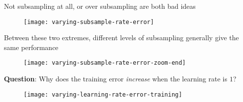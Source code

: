 %
\begin{frame}
Not subsampling at all, or over subsampling are both bad ideas

  \begin{figure}
    \texttt{[image: varying-subsample-rate-error]}
  \end{figure}
 
\end{frame}
%
\begin{frame}
Between these two extremes, different levels of subsampling generally give the same performance

  \begin{figure}
    \texttt{[image: varying-subsample-rate-error-zoom-end]}
  \end{figure}
  
\end{frame}
%


\begin{frame}
\textbf{Question}: Why does the training error \textit{increase} when the learning rate is $1$?

  \begin{figure}
    \texttt{[image: varying-learning-rate-error-training]}
  \end{figure}
  
\end{frame}
%


